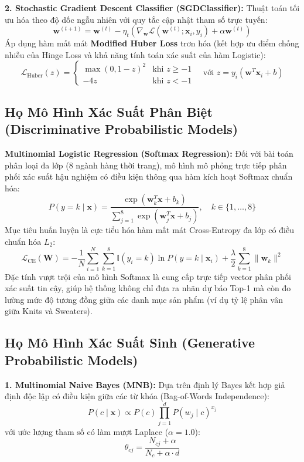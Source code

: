 \documentclass[12pt,a4paper]{report}
\begin{document}
\textbf{2. Stochastic Gradient Descent Classifier (SGDClassifier):}
Thuật toán tối ưu hóa theo độ dốc ngẫu nhiên với quy tắc cập nhật tham số trực tuyến:
\begin{equation}
\mathbf{w}^{(t+1)} = \mathbf{w}^{(t)} - \eta_t \left( \nabla_{\mathbf{w}} \mathcal{L}(\mathbf{w}^{(t)}; \mathbf{x}_i, y_i) + \alpha \mathbf{w}^{(t)} \right)
\end{equation}
Áp dụng hàm mất mát \textbf{Modified Huber Loss} trơn hóa (kết hợp ưu điểm chống nhiễu của Hinge Loss và khả năng tính toán xác suất của hàm Logistic):
\begin{equation}
\mathcal{L}_{\text{Huber}}(z) = \begin{cases} \max(0, 1 - z)^2 & \text{khi } z \ge -1 \\ -4z & \text{khi } z < -1 \end{cases} \quad \text{với } z = y_i(\mathbf{w}^T \mathbf{x}_i + b)
\end{equation}

\subsection{Họ Mô Hình Xác Suất Phân Biệt (Discriminative Probabilistic Models)}
\textbf{Multinomial Logistic Regression (Softmax Regression):}
Đối với bài toán phân loại đa lớp (8 ngành hàng thời trang), mô hình mô phỏng trực tiếp phân phối xác suất hậu nghiệm có điều kiện thông qua hàm kích hoạt Softmax chuẩn hóa:
\begin{equation}
P(y = k \mid \mathbf{x}) = \frac{\exp(\mathbf{w}_k^T \mathbf{x} + b_k)}{\sum_{j=1}^8 \exp(\mathbf{w}_j^T \mathbf{x} + b_j)}, \quad k \in \{1, \dots, 8\}
\end{equation}
Mục tiêu huấn luyện là cực tiểu hóa hàm mất mát Cross-Entropy đa lớp có điều chuẩn hóa $L_2$:
\begin{equation}
\mathcal{L}_{\text{CE}}(\mathbf{W}) = -\frac{1}{N} \sum_{i=1}^N \sum_{k=1}^8 \mathbb{I}(y_i = k) \ln P(y = k \mid \mathbf{x}_i) + \frac{\lambda}{2} \sum_{k=1}^8 \|\mathbf{w}_k\|^2
\end{equation}
Đặc tính vượt trội của mô hình Softmax là cung cấp trực tiếp vector phân phối xác suất tin cậy, giúp hệ thống không chỉ đưa ra nhãn dự báo Top-1 mà còn đo lường mức độ tương đồng giữa các danh mục sản phẩm (ví dụ tỷ lệ phân vân giữa Knits và Sweaters).

\subsection{Họ Mô Hình Xác Suất Sinh (Generative Probabilistic Models)}
\textbf{1. Multinomial Naive Bayes (MNB):}
Dựa trên định lý Bayes kết hợp giả định độc lập có điều kiện giữa các từ khóa (Bag-of-Words Independence):
\begin{equation}
P(c \mid \mathbf{x}) \propto P(c) \prod_{j=1}^d P(w_j \mid c)^{x_j}
\end{equation}
với ước lượng tham số có làm mượt Laplace ($\alpha = 1.0$):
\begin{equation}
\theta_{cj} = \frac{N_{cj} + \alpha}{N_c + \alpha \cdot d}
\end{equation}
\end{document}
